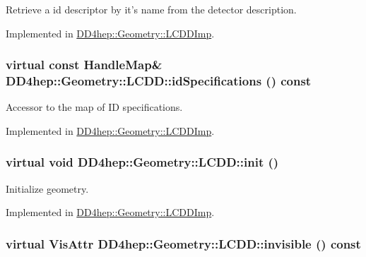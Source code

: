Retrieve a id descriptor by it's name from the detector description. 

Implemented in \hyperlink{class_d_d4hep_1_1_geometry_1_1_l_c_d_d_imp_ade361431838946ea24068e4e74632da4}{DD4hep::Geometry::LCDDImp}.\hypertarget{class_d_d4hep_1_1_geometry_1_1_l_c_d_d_a16ddadf18c24ad54b816354107338a80}{
\subsubsection[{idSpecifications}]{\setlength{\rightskip}{0pt plus 5cm}virtual const {\bf HandleMap}\& DD4hep::Geometry::LCDD::idSpecifications () const}}
\label{class_d_d4hep_1_1_geometry_1_1_l_c_d_d_a16ddadf18c24ad54b816354107338a80}


Accessor to the map of ID specifications. 

Implemented in \hyperlink{class_d_d4hep_1_1_geometry_1_1_l_c_d_d_imp_a85a31743f9716ca28a09afb1409ee3be}{DD4hep::Geometry::LCDDImp}.\hypertarget{class_d_d4hep_1_1_geometry_1_1_l_c_d_d_a9a4f55004e7375b2b20fb64e1a7ee8de}{
\subsubsection[{init}]{\setlength{\rightskip}{0pt plus 5cm}virtual void DD4hep::Geometry::LCDD::init ()}}
\label{class_d_d4hep_1_1_geometry_1_1_l_c_d_d_a9a4f55004e7375b2b20fb64e1a7ee8de}


Initialize geometry. 

Implemented in \hyperlink{class_d_d4hep_1_1_geometry_1_1_l_c_d_d_imp_af0cf7ab83180ee15085bcc7e1383f561}{DD4hep::Geometry::LCDDImp}.\hypertarget{class_d_d4hep_1_1_geometry_1_1_l_c_d_d_acafee280cadae2b44117eb751e0790aa}{
\subsubsection[{invisible}]{\setlength{\rightskip}{0pt plus 5cm}virtual {\bf VisAttr} DD4hep::Geometry::LCDD::invisible () const}}
\label{class_d_d4hep_1_1_geometry_1_1_l_c_d_d_acafee280cadae2b44117eb751e0790aa}


